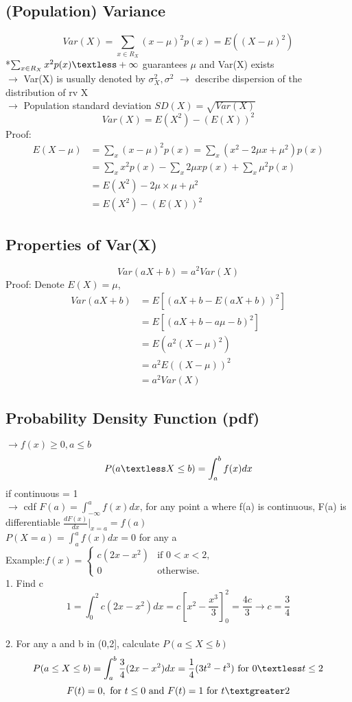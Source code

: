 \documentclass{article}
\begin{document}
\subsection{(Population) Variance}
\[Var(X) = \sum_{x\in R_X} (x-\mu)^2p(x) = E((X-\mu)^2)\]
*$\sum_{x\in R_X} x^2 p(x) \textless + \infty$ guarantees $\mu$ and Var(X) exists \\
$\rightarrow$ Var(X) is usually denoted by $\sigma_X^2 , \sigma^2$
$\rightarrow$ describe dispersion of the distribution of rv X\\
$\rightarrow$ Population standard deviation $SD(X) = \sqrt{Var(X)}$\\
\[Var(X) = E(X^2) - (E(X))^2\]
Proof:
\begin{align*}
    E(X-\mu ) &= \sum_{x}(x-\mu )^2p(x) = \sum_{x} (x^2 -2\mu x + \mu^2)p(x) \\ &= \sum_{x} x^2 p(x) - \sum_{x}2\mu x p(x) + \sum_{x}\mu^2 p(x) \\ &= E(X^2) - 2\mu \times \mu + \mu ^2 \\ &= E(X^2) - (E(X))^2 
\end{align*}
\subsection{Properties of Var(X)}
\[Var(aX+b) = a^2 Var(X)\]
Proof: Denote $E(X) = \mu$,
\begin{align*}
    Var(aX+b) &= E[(aX+b - E(aX+b))^2] \\
    &= E[(aX+b - a\mu -b )^2]\\
    &= E(a^2(X-\mu)^2)\\
    &= a^2 E((X-\mu))^2\\
    &= a^2 Var(X)
\end{align*}
\subsection{Probability Density Function (pdf)}
$\rightarrow f(x) \geq 0 , a \leq b$\\
\[P(a \textless X \leq b) = \int_a^b f(x) dx\] if continuous = 1\\
$\rightarrow$ cdf $F(a) = \int_{-\infty}^a f(x) dx $, for any point a where f(a) is continuous, F(a) is differentiable $\frac{dF(x)}{dx} |_{x=a} = f(a) $\\
$P(X=a) = \int_a^a f(x)dx =0$ for any a \\
Example:$f(x) = \begin{cases}
    c(2x - x^2) & \text{if } 0 < x < 2, \\
0 & \text{otherwise.}
\end{cases}$ \\
1. Find c \\
\[1=\int_0^2 c(2x-x^2)dx = c[x^2 - \frac{x^3}{3}]_0^2 = \frac{4c}{3} \rightarrow c=\frac{3}{4}\] \\
2. For any a and b in (0,2], calculate $P(a \leq X \leq b)$\\
\[P(a \leq X \leq b) = \int_a^b \frac{3}{4} (2x-x^2)dx = \frac{1}{4} (3t^2-t^3) \text{ for } 0 \textless t \leq 2\] 
\[F(t)=0, \text{ for } t \leq 0 \text{ and } F(t) =1 \text{ for } t \textgreater 2\]\\
\newpage
\end{document}
